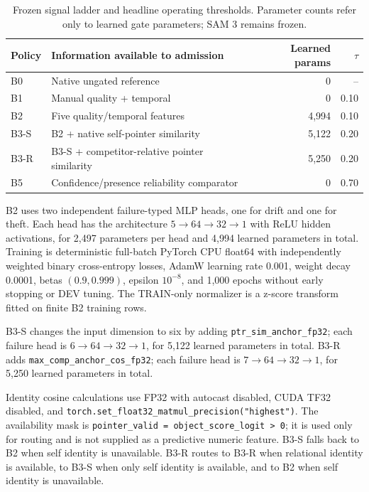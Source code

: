 \documentclass[10pt,twocolumn,letterpaper]{article}
\begin{document}
\begin{table}[t]
\centering
\small
\caption{Frozen signal ladder and headline operating thresholds.  Parameter
counts refer only to learned gate parameters; SAM 3 remains frozen.}
\label{tab:supp-gates}
\begin{tabular}{llrr}
\toprule
Policy & Information available to admission & Learned params & $\tau$ \\
\midrule
B0   & Native ungated reference & 0 & -- \\
B1   & Manual quality + temporal & 0 & 0.10 \\
B2   & Five quality/temporal features & 4,994 & 0.10 \\
B3-S & B2 + native self-pointer similarity & 5,122 & 0.20 \\
B3-R & B3-S + competitor-relative pointer similarity & 5,250 & 0.20 \\
B5   & Confidence/presence reliability comparator & 0 & 0.70 \\
\bottomrule
\end{tabular}
\end{table}

B2 uses two independent failure-typed MLP heads, one for drift and one for
theft.  Each head has the architecture
$5\!\rightarrow\!64\!\rightarrow\!32\!\rightarrow\!1$ with ReLU hidden
activations, for 2,497 parameters per head and 4,994 learned parameters in
total.  Training is deterministic full-batch PyTorch CPU float64 with
independently weighted binary cross-entropy losses, AdamW learning rate
0.001, weight decay 0.0001, betas $(0.9,0.999)$, epsilon $10^{-8}$, and
1,000 epochs without early stopping or DEV tuning.  The TRAIN-only
normalizer is a z-score transform fitted on finite B2 training rows.

B3-S changes the input dimension to six by adding
\texttt{ptr\_sim\_anchor\_fp32}; each failure head is
$6\!\rightarrow\!64\!\rightarrow\!32\!\rightarrow\!1$, for 5,122 learned
parameters in total.  B3-R adds
\texttt{max\_comp\_anchor\_cos\_fp32}; each failure head is
$7\!\rightarrow\!64\!\rightarrow\!32\!\rightarrow\!1$, for 5,250 learned
parameters in total.

Identity cosine calculations use FP32 with autocast disabled, CUDA TF32
disabled, and \texttt{torch.set\_float32\_matmul\_precision("highest")}.
The availability mask is
\texttt{pointer\_valid = object\_score\_logit > 0}; it is used only for
routing and is not supplied as a predictive numeric feature.  B3-S falls
back to B2 when self identity is unavailable.  B3-R routes to B3-R when
relational identity is available, to B3-S when only self identity is
available, and to B2 when self identity is unavailable.
\end{document}
